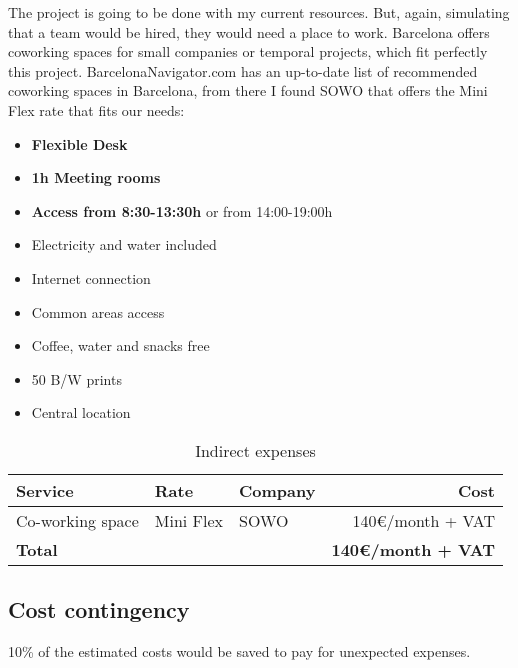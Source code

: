 The project is going to be done with my current resources. But, again, simulating that a team would be hired, they would need a place to work. Barcelona offers coworking spaces for small companies or temporal projects, which fit perfectly this project. BarcelonaNavigator.com has an up-to-date list of recommended coworking spaces in Barcelona, from there I found SOWO that offers the Mini Flex rate \cite{coworking} that fits our needs:
\begin{multicols}{2}
\begin{itemize}
    \item \textbf{Flexible Desk}
    \item \textbf{1h Meeting rooms}
    \item \textbf{Access from 8:30-13:30h} \newline or from 14:00-19:00h
    \item Electricity and water included
    \item Internet connection
    \item Common areas access
    \item Coffee, water and snacks free
    \item 50 B/W prints
    \item Central location
\end{itemize}
\end{multicols}

\begin{table}[h!]
\centering
\begin{tabular}{lllr}
    \toprule
    \textbf{Service} & \textbf{Rate} & \textbf{Company} & \textbf{Cost} \\
    \midrule
    Co-working space & Mini Flex \cite{coworking} & SOWO & 140€/month + VAT \\
    \midrule
    \textbf{Total} & & & \textbf{140€/month + VAT} \\
    \bottomrule
\end{tabular}
\caption{Indirect expenses}
\label{other-costs-table}
\end{table}

\newpage
\subsection{Cost contingency}

10\% of the estimated costs would be saved to pay for unexpected expenses.

